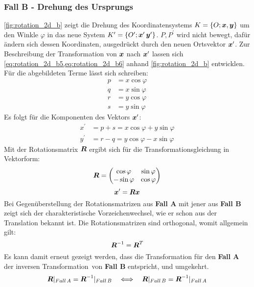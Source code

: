 \subsubsection{Fall B - Drehung des Ursprungs}
\cref{fig:rotation_2d_b} zeigt die Drehung des Koordinatensystems $K = \{O;\boldsymbol{x},\boldsymbol{y}\}$ um den Winkle $\varphi$ in das neue System $K^\prime = \{O^\prime;\boldsymbol{x}^\prime\,\boldsymbol{y}^\prime\}$. $P,P^\prime$ wird nicht bewegt, dafür ändern sich dessen Koordinaten, ausgedrückt durch den neuen Ortsvektor $\boldsymbol{x}^\prime$. Zur Beschreibung der Transformation von $\boldsymbol{x}$ nach $\boldsymbol{x}^\prime$ lassen sich \cref{eq:rotation_2d_b5,eq:rotation_2d_b6} anhand \cref{fig:rotation_2d_b} entwicklen. Für die abgebildeten Terme lässt sich schreiben:
\begin{align}
    p &= x\cos{\varphi}\label{eq:rotation_2d_b1}\\
    q &= x\sin{\varphi}\label{eq:rotation_2d_b2}\\
    r &= y\cos{\varphi}\label{eq:rotation_2d_b3}\\
    s &= y\sin{\varphi}\label{eq:rotation_2d_b4}
\end{align}
Es folgt für die Komponenten des Vektors $\boldsymbol{x}^\prime$:
\begin{align}
    x^\prime &= p + s = x\cos{\varphi} + y\sin{\varphi}\label{eq:rotation_2d_b5}\\
    y^\prime &= r - q = y\cos{\varphi} - x\sin{\varphi}\label{eq:rotation_2d_b6}
\end{align}
Mit der Rotationsmatrix $\boldsymbol{R}$ ergibt sich für die Transformationsgleichung in Vektorform:
\begin{gather}
    \boldsymbol{R}=
    \begin{pmatrix}
        \cos{\varphi} & \sin{\varphi} \\
        -\sin{\varphi} & \cos{\varphi} 
    \end{pmatrix}
    \label{eq:rotation_2d_b7}
\end{gather}
\begin{equation}
    \boldsymbol{x}^\prime = \boldsymbol{R}\boldsymbol{x} \label{eq:rotation_2d_b8}
\end{equation}
Bei Gegenüberstellung der Rotationsmatrizen aus \textbf{Fall A}  mit jener aus \textbf{Fall B}  zeigt sich der charakteristische Vorzeichenwechsel, wie er schon aus der Translation bekannt ist. Die Rotationsmatrizen sind orthogonal, womit allgemein gilt:
\begin{equation}
    \boldsymbol{R}^{-1} = \boldsymbol{R}^{T}\label{eq:rotation_2d_b9}
\end{equation}
Es kann damit erneut gezeigt werden, dass die Transformation für den \textbf{Fall A} der \glqq inversen Transformation\grqq\ von \textbf{Fall B} entspricht, und umgekehrt.
\begin{equation}
    \boldsymbol{R}|_{Fall\,A} = \boldsymbol{R}^{-1}|_{Fall\,B}
    \quad\Longleftrightarrow\quad
    \boldsymbol{R}|_{Fall\,B} = \boldsymbol{R}^{-1}|_{Fall\,A}
    \label{eq:rotation_2d_b10}
\end{equation}
